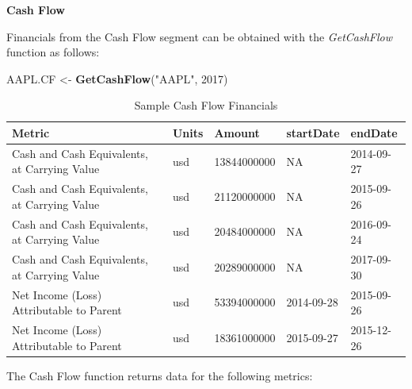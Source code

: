 \documentclass[]{book}
\newenvironment{Shaded}{\begin{snugshade}}{\end{snugshade}}
\newcommand{\KeywordTok}[1]{\textcolor[rgb]{0.13,0.29,0.53}{\textbf{#1}}}
\newcommand{\DecValTok}[1]{\textcolor[rgb]{0.00,0.00,0.81}{#1}}
\newcommand{\StringTok}[1]{\textcolor[rgb]{0.31,0.60,0.02}{#1}}
\newcommand{\NormalTok}[1]{#1}
\theoremstyle{definition}
\theoremstyle{definition}
\theoremstyle{definition}
\theoremstyle{remark}
\begin{document}
\textbf{Cash Flow}

Financials from the Cash Flow segment can be obtained with the
\emph{GetCashFlow} function as follows:

\begin{Shaded}
\begin{Highlighting}[]
\NormalTok{AAPL.CF <-}\StringTok{ }\KeywordTok{GetCashFlow}\NormalTok{(}\StringTok{"AAPL"}\NormalTok{, }\DecValTok{2017}\NormalTok{)}
\end{Highlighting}
\end{Shaded}

\begin{table}[t]

\caption{\label{tab:unnamed-chunk-36}Sample Cash Flow Financials}
\centering
\begin{tabular}{lllll}
\toprule
Metric & Units & Amount & startDate & endDate\\
\midrule
Cash and Cash Equivalents, at Carrying Value & usd & 13844000000 & NA & 2014-09-27\\
Cash and Cash Equivalents, at Carrying Value & usd & 21120000000 & NA & 2015-09-26\\
Cash and Cash Equivalents, at Carrying Value & usd & 20484000000 & NA & 2016-09-24\\
Cash and Cash Equivalents, at Carrying Value & usd & 20289000000 & NA & 2017-09-30\\
Net Income (Loss) Attributable to Parent & usd & 53394000000 & 2014-09-28 & 2015-09-26\\
\addlinespace
Net Income (Loss) Attributable to Parent & usd & 18361000000 & 2015-09-27 & 2015-12-26\\
\bottomrule
\end{tabular}
\end{table}

The Cash Flow function returns data for the following metrics:
\end{document}
